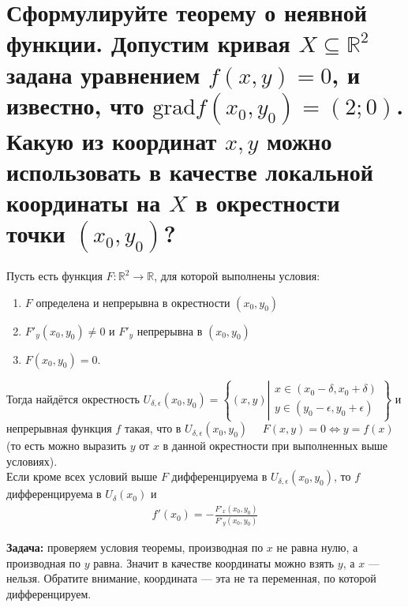 \documentclass{article}
\begin{document}
\section{Сформулируйте теорему о неявной функции. Допустим кривая $X \subseteq \mathbb{R}^2$ задана уравнением $f(x,y)=0$, и известно, что $\mathrm{grad}f(x_0,y_0)=(2;0)$. Какую из координат $x,y$ можно использовать в качестве локальной координаты на $X$ в окрестности точки $(x_0,y_0)$?}
\begin{theorem}
Пусть есть функция $F: \mathbb{R}^2\xrightarrow{} \mathbb{R}$, для которой выполнены условия:
\begin{enumerate}
\item $F$ определена и непрерывна в окрестности $(x_0,y_0)$ \item $F'_y(x_0,y_0)\not=0$ и $F'_y$ непрерывна в $(x_0,y_0)$ \item $F(x_0, y_0)=0$.
\end{enumerate}
Тогда найдётся окрестность $U_{\delta,\epsilon}(x_0,y_0)=\left\{(x,y)\left|\begin{array}{l}
     x \in (x_0-\delta, x_0 +\delta) \\
     y \in (y_0-\epsilon,y_0+\epsilon)
\end{array}\right.\right\}$ и непрерывная функция $f$ такая, что в $U_{\delta,\epsilon}(x_0,y_0)\quad$ $F(x,y)=0 \Leftrightarrow y = f(x)$ (то есть можно выразить $y$ от $x$ в данной окрестности при выполненных выше условиях).\\
Если кроме всех условий выше $F$ дифференцируема в $U_{\delta,\epsilon}(x_0,y_0)$, то $f$ дифференцируема в $U_{\delta}(x_0)$ и
\begin{gather*}
    f'(x_0)=-\frac{F'_x(x_0,y_0)}{F'_y(x_0,y_0)}
\end{gather*}
\end{theorem}
\textbf{Задача:} проверяем условия теоремы, производная по $x$ не равна нулю, а производная по $y$ равна. Значит в качестве координаты можно взять $y$, а $x$ --- нельзя. Обратите внимание, координата --- эта не та переменная, по которой дифференцируем.
\end{document}
